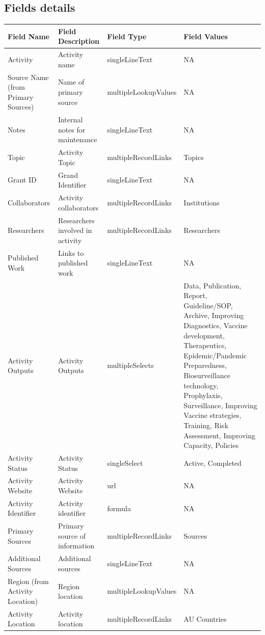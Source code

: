 \documentclass[
]{book}
\begin{document}
\hypertarget{fields-details}{%
\subsection{Fields details}\label{fields-details}}

\begin{table}
\centering
\begin{tabular}{l|l|l|l}
\hline
\textbf{Field Name} & \textbf{Field Description} & \textbf{Field Type} & \textbf{Field Values}\\
\hline
Activity & Activity name & singleLineText & NA\\
\hline
Source Name (from Primary Sources) & Name of primary source & multipleLookupValues & NA\\
\hline
Notes & Internal notes for maintenance & singleLineText & NA\\
\hline
Topic & Activity Topic & multipleRecordLinks & Topics\\
\hline
Grant ID & Grand Identifier & singleLineText & NA\\
\hline
Collaborators & Activity collaborators & multipleRecordLinks & Institutions\\
\hline
Researchers & Researchers involved in activity & multipleRecordLinks & Researchers\\
\hline
Published Work & Links to published work & singleLineText & NA\\
\hline
Activity Outputs & Activity Outputs & multipleSelects & Data, Publication, Report, Guideline/SOP, Archive, Improving Diagnostics, Vaccine development, Therapeutics, Epidemic/Pandemic Preparedness, Biosurveillance technology, Prophylaxis, Surveillance, Improving Vaccine strategies, Training, Risk Assessment, Improving Capacity, Policies\\
\hline
Activity Status & Activity Status & singleSelect & Active, Completed\\
\hline
Activity Website & Activity Website & url & NA\\
\hline
Activity Identifier & Activity identifier & formula & NA\\
\hline
Primary Sources & Primary source of information & multipleRecordLinks & Sources\\
\hline
Additional Sources & Additional sources & singleLineText & NA\\
\hline
Region (from Activity Location) & Region location & multipleLookupValues & NA\\
\hline
Activity Location & Activity location & multipleRecordLinks & AU Countries\\

\end{tabular}
\end{table}
\end{document}
